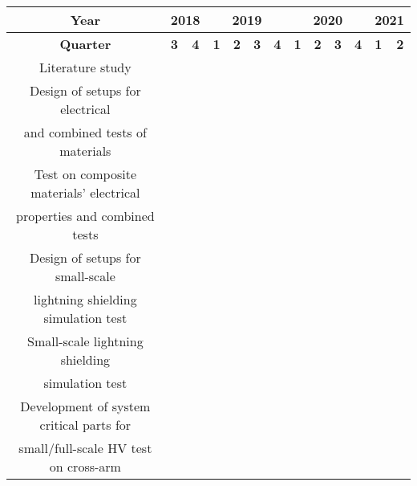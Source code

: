 \begin{tabular}{|c|p{\tabcolwidth}|p{\tabcolwidth}|p{\tabcolwidth}|p{\tabcolwidth}|p{\tabcolwidth}|p{\tabcolwidth}|p{\tabcolwidth}|p{\tabcolwidth}|p{\tabcolwidth}|p{\tabcolwidth}|p{\tabcolwidth}|p{\tabcolwidth}|}
\hline
    \bf Year & \multicolumn{2}{c|}{\bf 2018} & \multicolumn{4}{c|}{\bf 2019} &\multicolumn{4}{c|}{\bf 2020}& \multicolumn{2}{c|}{\bf 2021} \\
    \hline
    \centering\bf Quarter & \centering\bf 3 & \centering\bf 4 & \centering\bf 1 & \centering\bf 2 & \centering\bf 3 & \centering\bf 4 & \centering\bf 1 & \centering\bf 2 & \centering\bf 3 & \centering\bf 4 & \centering\bf 1 & \multicolumn{1}{c|}{\bf 2}  \\
    \hline
    Literature study & \cellcolor{green} & \cellcolor{green} & \cellcolor{green} & \cellcolor{yellow} & & & & & & & &  \cellcolor{lighterblue}\\
    \hline
    Design of setups for electrical & & \cellcolor{green} & \cellcolor{green} & \cellcolor{yellow} & & & & & & & & \cellcolor{lighterblue}\\
    and combined tests of materials &  & \cellcolor{green} & \cellcolor{green} & \cellcolor{yellow} & & & & & & & &  \cellcolor{lighterblue}\\
    \hline
    Test on composite materials’ electrical & & \cellcolor{green} & \cellcolor{green} & \cellcolor{yellow} & \cellcolor{red}& & & & & & & \cellcolor{lighterblue}\\
    properties and combined tests &  & \cellcolor{green} & \cellcolor{green} & \cellcolor{yellow} &\cellcolor{red} & & & & & & &  \cellcolor{lighterblue}\\
    \hline
    Design of setups for small-scale & & & \cellcolor{green} & \cellcolor{yellow} & & & & & & & & \cellcolor{lighterblue}\\
    lightning shielding simulation test &  &  & \cellcolor{green} & \cellcolor{yellow} & & & & & & & &  \cellcolor{lighterblue}\\
    \hline
    Small-scale lightning shielding & & & & & \cellcolor{red} & \cellcolor{red} & & & & & & \cellcolor{lighterblue}\\
    simulation test &  & & & & \cellcolor{red} & \cellcolor{red} & & & & & &  \cellcolor{lighterblue}\\
    \hline
    Development of system critical parts for& & & & & \cellcolor{red} & \cellcolor{red} & & & & & & \cellcolor{lighterblue}\\
     small/full-scale HV test on cross-arm &  & & & & \cellcolor{red} & \cellcolor{red} & & & & & &  \cellcolor{lighterblue}\\

\end{tabular}
